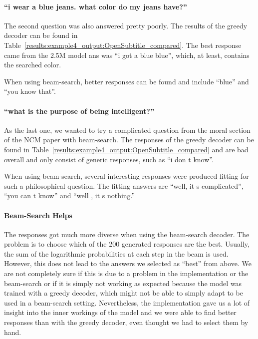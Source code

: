 \paragraph{``i wear a blue jeans. what color do my jeans have?''} The second question was also answered pretty poorly. The results of the greedy decoder can be found in Table~\ref{results:example4_output:OpenSubtitle_compared}. The best response came from the 2.5M model ans was ``i got a blue blue'', which, at least, contains the searched color.

When using beam-search, better responses can be found and include ``blue'' and ``you know that''.

\paragraph{``what is the purpose of being intelligent?''} As the last one, we wanted to try a complicated question from the moral section of the NCM paper with beam-search. The responses of the greedy decoder can be found in Table~\ref{results:example4_output:OpenSubtitle_compared} and are bad overall and only consist of generic responses, such as ``i don t know''.

When using beam-search, several interesting responses were produced fitting for such a philosophical question. The fitting answers are ``well, it s complicated'', ``you can t know'' and ``well , it s nothing.''

\paragraph{Beam-Search Helps} The responses got much more diverse when using the beam-search decoder. The problem is to choose which of the 200 generated responses are the best. Usually, the sum of the logarithmic probabilities at each step in the beam is used. However, this does not lead to the answers we selected as ``best'' from above. We are not completely sure if this is due to a problem in the implementation or the beam-search or if it is simply not working as expected because the model was trained with a greedy decoder, which might not be able to simply adapt to be used in a beam-search setting. Nevertheless, the implementation gave us a lot of insight into the inner workings of the model and we were able to find better responses than with the greedy decoder, even thought we had to select them by hand.

